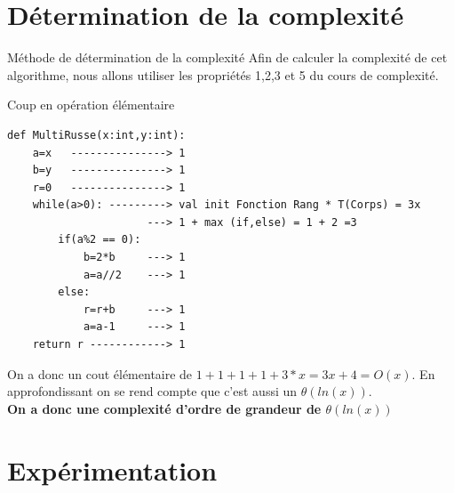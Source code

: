 \documentclass[12pt,a4paper]{report}
\begin{document}
\section{Détermination de la complexité}
\begin{mybox}{Méthode de détermination de la complexité}
Afin de calculer la complexité de cet algorithme, nous allons utiliser les propriétés 1,2,3 et 5 du cours de complexité.
\end{mybox}
\begin{Cas3}{Coup en opération élémentaire}
 \begin{lstlisting}
def MultiRusse(x:int,y:int):
    a=x   ---------------> 1
    b=y   ---------------> 1
    r=0   ---------------> 1
    while(a>0): ---------> val init Fonction Rang * T(Corps) = 3x
    	              ---> 1 + max (if,else) = 1 + 2 =3
    	if(a%2 == 0): 
            b=2*b     ---> 1
            a=a//2    ---> 1
        else:
            r=r+b     ---> 1
            a=a-1     ---> 1
    return r ------------> 1
\end{lstlisting}
\end{Cas3}
\begin{flushleft}
On a donc un cout élémentaire de $1+1+1+1+3*x=3x+4=O(x)$. En approfondissant on se rend compte que c'est aussi un $\theta(ln(x))$.\\
\textbf{On a donc une complexité d'ordre de grandeur de $\theta(ln(x))$}
\end{flushleft}
\section{Expérimentation}
\end{document}
